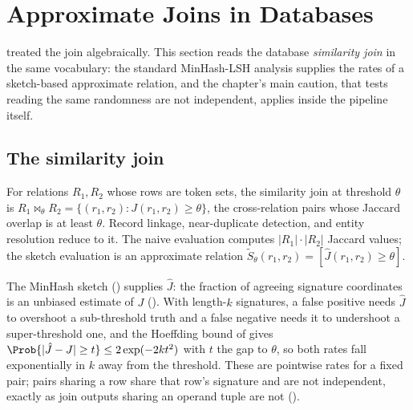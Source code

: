 %

\section{Approximate Joins in Databases}
\label{sec:approximate-joins}

 treated the join algebraically. This section reads
the database \emph{similarity join} in the same vocabulary: the standard
MinHash-LSH analysis supplies the rates of a sketch-based approximate relation,
and the chapter's main caution, that tests reading the same randomness are not
independent, applies inside the pipeline itself.

\subsection*{The similarity join}

For relations $R_1, R_2$ whose rows are token sets, the similarity join at
threshold $\theta$ is $R_1 \bowtie_\theta R_2 = \{(r_1, r_2) : J(r_1, r_2) \ge
\theta\}$, the cross-relation pairs whose Jaccard overlap is at least $\theta$.
Record linkage, near-duplicate detection, and entity resolution reduce to it. The
naive evaluation computes $|R_1| \cdot |R_2|$ Jaccard values; the sketch evaluation
is an approximate relation $\tilde S_\theta(r_1, r_2) = [\hat J(r_1, r_2) \ge
\theta]$.

The MinHash sketch () supplies $\hat J$: the
fraction of agreeing signature coordinates is an unbiased estimate of $J$
(). With length-$k$ signatures, a false positive needs
$\hat J$ to overshoot a sub-threshold truth and a false negative needs it to
undershoot a super-threshold one, and the Hoeffding bound of
 gives $\Prob{|\hat J - J| \ge t} \le 2 \exp(-2kt^2)$ with
$t$ the gap to $\theta$, so both rates fall exponentially in $k$ away from the
threshold. These are pointwise rates for a fixed pair; pairs sharing a row share
that row's signature and are not independent, exactly as join outputs sharing an
operand tuple are not ().

